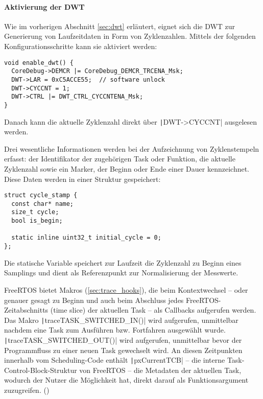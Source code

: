 \paragraph{Aktivierung der DWT}

Wie im vorherigen Abschnitt \ref{sec:dwt} erläutert, eignet sich die DWT zur
Generierung von Laufzeitdaten in Form von Zyklenzahlen. Mittels der folgenden
Konfigurationsschritte kann sie aktiviert werden:

\begin{code}
\begin{verbatim}
void enable_dwt() {
  CoreDebug->DEMCR |= CoreDebug_DEMCR_TRCENA_Msk;
  DWT->LAR = 0xC5ACCE55;  // software unlock
  DWT->CYCCNT = 1;
  DWT->CTRL |= DWT_CTRL_CYCCNTENA_Msk;
}
\end{verbatim}
\end{code}

Danach kann die aktuelle Zyklenzahl direkt über \texttt|DWT->CYCCNT|
ausgelesen werden.

Drei wesentliche Informationen werden bei der Aufzeichnung von Zyklenstempeln
erfasst: der Identifikator der zugehörigen Task oder Funktion, die aktuelle
Zyklenzahl sowie ein Marker, der Beginn oder Ende einer Dauer kennzeichnet.
Diese Daten werden in einer Struktur gespeichert:

\begin{code}
\begin{verbatim}
struct cycle_stamp {
  const char* name;
  size_t cycle;
  bool is_begin;

  static inline uint32_t initial_cycle = 0;
};
\end{verbatim}
\end{code}

Die statische Variable speichert zur Laufzeit die Zyklenzahl zu Beginn eines
Samplings und dient als Referenzpunkt zur Normalisierung der Messwerte.

FreeRTOS bietet Makros (\ref{sec:trace_hooks}), die beim Kontextwechsel -- oder
genauer gesagt zu Beginn und auch beim Abschluss jedes FreeRTOS-Zeitabschnitts
(time slice) der aktuellen Task -- als Callbacks aufgerufen werden. Das Makro
\texttt|traceTASK_SWITCHED_IN()| wird aufgerufen, unmittelbar nachdem
eine Task zum Ausführen bzw. Fortfahren ausgewählt wurde.
\texttt|traceTASK_SWITCHED_OUT()| wird aufgerufen, unmittelbar bevor
der Programmfluss zu einer neuen Task gewechselt wird. An diesen Zeitpunkten
innerhalb vom Scheduling-Code enthält \texttt|pxCurrentTCB| -- die
interne Task-Control-Block-Struktur von FreeRTOS -- die Metadaten der aktuellen
Task, wodurch der Nutzer die Möglichkeit hat, direkt darauf als
Funktionsargument zuzugreifen. (\cite{freertos_rtos_trace_hooks})

